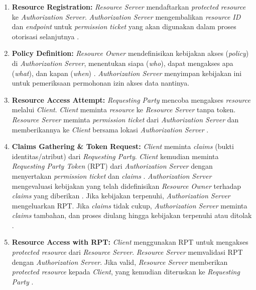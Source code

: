 \begin{enumerate}
    \item \textbf{Resource Registration:} \textit{Resource Server} mendaftarkan \textit{protected resource} ke \textit{Authorization Server}. \textit{Authorization Server} mengembalikan \textit{resource ID} dan \textit{endpoint} untuk \textit{permission ticket} yang akan digunakan dalam proses otorisasi selanjutnya \autocite{umaspec}.
    
    \item \textbf{Policy Definition:} \textit{Resource Owner} mendefinisikan kebijakan akses (\textit{policy}) di \textit{Authorization Server}, menentukan siapa (\textit{who}), dapat mengakses apa (\textit{what}), dan kapan (\textit{when}) \autocite{jaimeauthorizationmodels}. \textit{Authorization Server} menyimpan kebijakan ini untuk pemeriksaan permohonan izin akses data nantinya.
    
    \item \textbf{Resource Access Attempt:} \textit{Requesting Party} mencoba mengakses \textit{resource} melalui \textit{Client}. \textit{Client} meminta \textit{resource} ke \textit{Resource Server} tanpa token. \textit{Resource Server} meminta \textit{permission ticket} dari \textit{Authorization Server} dan memberikannya ke \textit{Client} bersama lokasi \textit{Authorization Server} \autocite{umaspec}.
    
    \item \textbf{Claims Gathering \& Token Request:} \textit{Client} meminta \textit{claims} (bukti identitas/atribut) dari \textit{Requesting Party}. \textit{Client} kemudian meminta \textit{Requesting Party Token} (RPT) dari \textit{Authorization Server} dengan menyertakan \textit{permission ticket} dan \textit{claims} \autocite{umaspec}. \textit{Authorization Server} mengevaluasi kebijakan yang telah didefinisikan \textit{Resource Owner} terhadap \textit{claims} yang diberikan \autocite{jaimeauthorizationmodels}. Jika kebijakan terpenuhi, \textit{Authorization Server} mengeluarkan RPT. Jika \textit{claims} tidak cukup, \textit{Authorization Server} meminta \textit{claims} tambahan, dan proses diulang hingga kebijakan terpenuhi atau ditolak \autocite{umaspec}.
    
    \item \textbf{Resource Access with RPT:} \textit{Client} menggunakan RPT untuk mengakses \textit{protected resource} dari \textit{Resource Server}. \textit{Resource Server} memvalidasi RPT dengan \textit{Authorization Server}. Jika valid, \textit{Resource Server} memberikan \textit{protected resource} kepada \textit{Client}, yang kemudian diteruskan ke \textit{Requesting Party} \autocite{umaspec}.
\end{enumerate}

